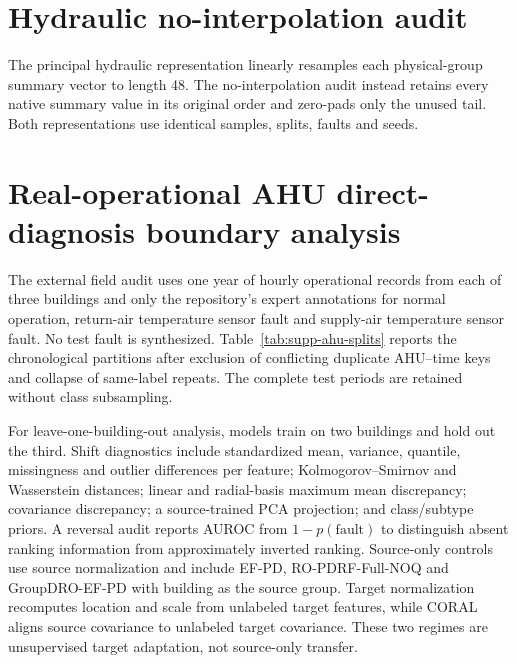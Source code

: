 \documentclass[10pt]{article}
\begin{document}
\section{Hydraulic no-interpolation audit}

The principal hydraulic representation linearly resamples each physical-group summary vector to length 48. The no-interpolation audit instead retains every native summary value in its original order and zero-pads only the unused tail. Both representations use identical samples, splits, faults and seeds.

\begin{table}[ht]
\centering
\caption{Affected-subset macro-AUROC under controlled hydraulic pressure faults. Difference is RO-PDRF-NOQ minus CAGF.}
\resizebox{0.82\textwidth}{!}{}
\end{table}

\section{Real-operational AHU direct-diagnosis boundary analysis}

The external field audit uses one year of hourly operational records from each of three buildings and only the repository's expert annotations for normal operation, return-air temperature sensor fault and supply-air temperature sensor fault. No test fault is synthesized. Table~\ref{tab:supp-ahu-splits} reports the chronological partitions after exclusion of conflicting duplicate AHU--time keys and collapse of same-label repeats. The complete test periods are retained without class subsampling.

For leave-one-building-out analysis, models train on two buildings and hold out the third. Shift diagnostics include standardized mean, variance, quantile, missingness and outlier differences per feature; Kolmogorov--Smirnov and Wasserstein distances; linear and radial-basis maximum mean discrepancy; covariance discrepancy; a source-trained PCA projection; and class/subtype priors. A reversal audit reports AUROC from $1-p(\mathrm{fault})$ to distinguish absent ranking information from approximately inverted ranking. Source-only controls use source normalization and include EF-PD, RO-PDRF-Full-NOQ and GroupDRO-EF-PD with building as the source group. Target normalization recomputes location and scale from unlabeled target features, while CORAL aligns source covariance to unlabeled target covariance. These two regimes are unsupervised target adaptation, not source-only transfer.
\end{document}

